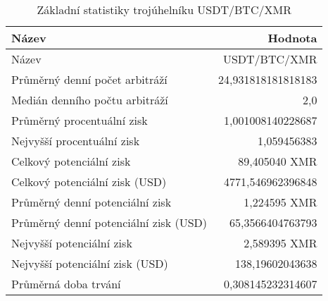 \begin{table}\centering
\caption{Základní statistiky trojúhelníku USDT/BTC/XMR}
\label{USDTBTCXMR_stats}
\begin{tabular}{|| l | r ||}
\hline Název & Hodnota \\ 
\hline\hline Název & USDT/BTC/XMR \\ 
\hline Průměrný denní počet arbitráží & 24,931818181818183 \\ 
\hline Medián denního počtu arbitráží & 2,0 \\ 
\hline Průměrný procentuální zisk & 1,001008140228687 \\ 
\hline Nejvyšší procentuální zisk & 1,059456383 \\ 
\hline Celkový potenciální zisk & 89,405040 XMR \\ 
\hline Celkový potenciální zisk (USD) & 4771,546962396848 \\ 
\hline Průměrný denní potenciální zisk & 1,224595 XMR \\ 
\hline Průměrný denní potenciální zisk (USD) & 65,3566404763793 \\ 
\hline Nejvyšší potenciální zisk & 2,589395 XMR \\ 
\hline Nejvyšší potenciální zisk (USD) & 138,19602043638 \\ 
\hline Průměrná doba trvání & 0,308145232314607 \\ 
\hline
\end{tabular}
\end{table}